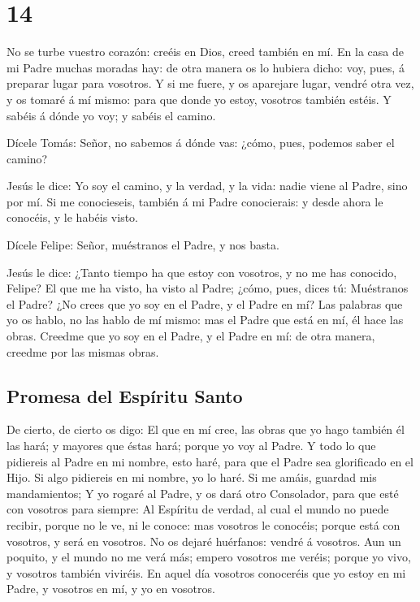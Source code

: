\hypertarget{section-13}{%
\section{14}\label{section-13}}

 No se turbe vuestro corazón: creéis en Dios, creed también
en mí.  En la casa de mi Padre muchas moradas hay: de otra
manera os lo hubiera dicho: voy, pues, á preparar lugar para vosotros.
 Y si me fuere, y os aparejare lugar, vendré otra vez, y os
tomaré á mí mismo: para que donde yo estoy, vosotros también estéis.
 Y sabéis á dónde yo voy; y sabéis el camino.

 Dícele Tomás: Señor, no sabemos á dónde vas: ¿cómo, pues,
podemos saber el camino?

 Jesús le dice: Yo soy el camino, y la verdad, y la vida:
nadie viene al Padre, sino por mí.  Si me conocieseis,
también á mi Padre conocierais: y desde ahora le conocéis, y le habéis
visto.

 Dícele Felipe: Señor, muéstranos el Padre, y nos basta.

 Jesús le dice: ¿Tanto tiempo ha que estoy con vosotros, y
no me has conocido, Felipe? El que me ha visto, ha visto al Padre;
¿cómo, pues, dices tú: Muéstranos el Padre?  ¿No crees que
yo soy en el Padre, y el Padre en mí? Las palabras que yo os hablo, no
las hablo de mí mismo: mas el Padre que está en mí, él hace las obras.
 Creedme que yo soy en el Padre, y el Padre en mí: de otra
manera, creedme por las mismas obras.

\hypertarget{promesa-del-espuxedritu-santo}{%
\subsection{Promesa del Espíritu
Santo}\label{promesa-del-espuxedritu-santo}}

 De cierto, de cierto os digo: El que en mí cree, las obras
que yo hago también él las hará; y mayores que éstas hará; porque yo voy
al Padre.  Y todo lo que pidiereis al Padre en mi nombre,
esto haré, para que el Padre sea glorificado en el Hijo. 
Si algo pidiereis en mi nombre, yo lo haré.  Si me amáis,
guardad mis mandamientos;  Y yo rogaré al Padre, y os dará
otro Consolador, para que esté con vosotros para siempre: 
Al Espíritu de verdad, al cual el mundo no puede recibir, porque no le
ve, ni le conoce: mas vosotros le conocéis; porque está con vosotros, y
será en vosotros.  No os dejaré huérfanos: vendré á
vosotros.  Aun un poquito, y el mundo no me verá más;
empero vosotros me veréis; porque yo vivo, y vosotros también viviréis.
 En aquel día vosotros conoceréis que yo estoy en mi Padre,
y vosotros en mí, y yo en vosotros.

